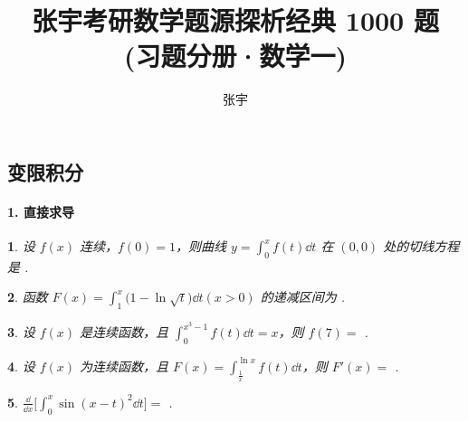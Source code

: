 \documentclass[openany,twocolumn]{ctexbook}
\title{张宇考研数学题源探析经典 1000 题\\(习题分册·数学一)}
\author{张宇}
\theoremstyle{change}
\newtheorem{ti}{}[section]
\newcommand{\hone}[1]{ \uline{\hspace{#1 pc}}}
\begin{document}
	
	\subsection{变限积分}
	\paragraph{1. 直接求导}

	\begin{ti}
		设 $f(x)$ 连续，$f(0) = 1$，则曲线 $y = \int_{0}^{x} f(t) \dd{t}$ 在 $(0,0)$ 处的切线方程是\hone{6}.
	\end{ti}

	\begin{ti}
		函数 $F(x) = \int_{1}^{x} \bigl( 1 - \ln \sqrt{t} \bigr) \dd{t} (x > 0)$ 的递减区间为\hone{6}.
	\end{ti}

	\begin{ti}
		设 $f(x)$ 是连续函数，且 $\int_{0}^{x^{3} - 1} f(t) \dd{t} = x$，则 $f(7) = $\hone{4}.
	\end{ti}

	\begin{ti}
		设 $f(x)$ 为连续函数，且 $F(x) = \int_{\frac{1}{x}}^{\ln x} f(t) \dd{t}$，则 $F'(x) = $\hone{6}.
	\end{ti}

	\begin{ti}
		$\frac{\dd}{\dd{x}} \bigl[ \int_{0}^{x} \sin (x - t)^{2} \dd{t} \bigr] = $\hone{6}.
	\end{ti}
\end{document}
